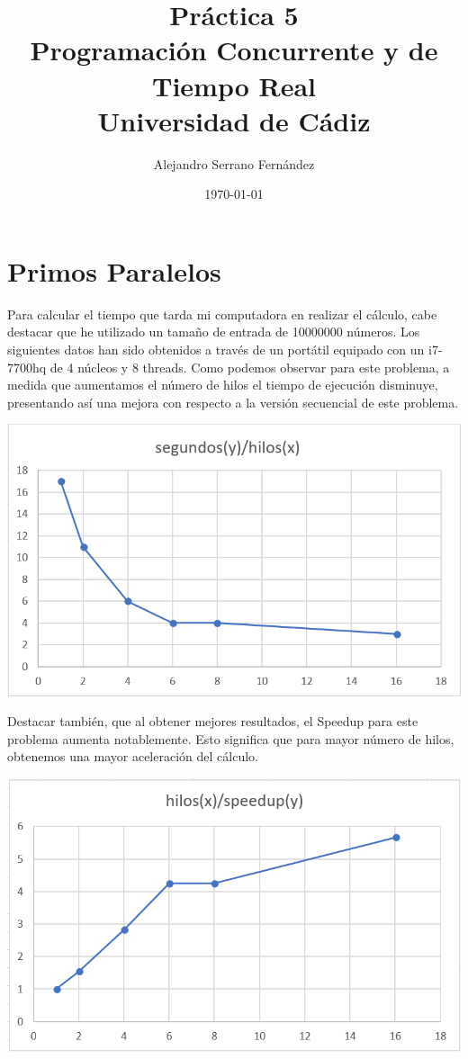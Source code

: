 \documentclass{article}
\title{Práctica 5 \\ Programación Concurrente y de Tiempo Real \\Universidad de Cádiz} %
\author{Alejandro Serrano Fernández} %
\date{\today} %
\begin{document}
\maketitle %



\section{Primos Paralelos}
Para calcular el tiempo que tarda mi computadora en realizar el cálculo, cabe destacar que he utilizado un tamaño de entrada de 10000000 números. Los siguientes datos han sido obtenidos a través de un portátil equipado con un i7-7700hq de 4 núcleos y 8 threads. Como podemos observar para este problema, a medida que aumentamos el número de hilos el tiempo de ejecución disminuye, presentando así una mejora con respecto a la versión secuencial de este problema.
\hfill \break
\begin{center}
\includegraphics[scale=0.5]{grafica-ejercicio1-primos-tiempo-hilos.png}
\end{center}
\hfill \break
Destacar también, que al obtener mejores resultados, el Speedup para este problema aumenta notablemente. Esto significa que para mayor número de hilos, obtenemos una mayor aceleración del cálculo.
\hfill \break
\begin{center}
\includegraphics[scale=0.5]{grafica-ejercicio1-primos-hilos-speedup.png}
\end{center}
\end{document}
